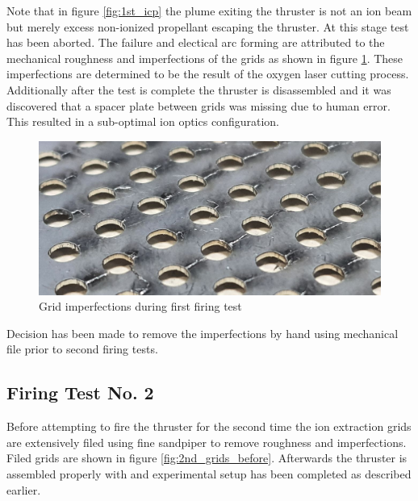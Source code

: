 Note that in figure \ref{fig:1st_icp} the plume exiting the thruster is not an ion beam but merely excess non-ionized propellant escaping the thruster.
At this stage test has been aborted. The failure and electical arc forming are attributed to the mechanical roughness and imperfections of the grids as shown in figure \ref{fig:1st_imperfect}. These imperfections are determined to be the result of the oxygen laser cutting process. Additionally after the test is complete the thruster is disassembled and it was discovered that a spacer plate between grids was missing due to human error. This resulted in a sub-optimal ion optics configuration.

\begin{figure}[ht]
    \centering
    \includegraphics[scale=0.3]{fig/imperfect1.jpeg}
    \caption{Grid imperfections during first firing test}
    \label{fig:1st_imperfect}
\end{figure}

Decision has been made to remove the imperfections by hand using mechanical file prior to second firing tests.
\newpage
\subsection{Firing Test No. 2}
Before attempting to fire the thruster for the second time the ion extraction grids are extensively filed using fine sandpiper to remove roughness and imperfections. Filed grids are shown in figure \ref{fig:2nd_grids_before}. Afterwards the thruster is assembled properly with and experimental setup has been completed as described earlier. 

